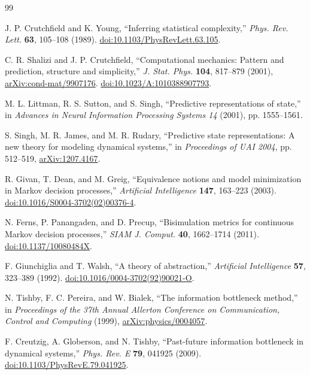 \documentclass[11pt]{article}
\begin{document}
\begin{thebibliography}{99}

J. P. Crutchfield and K. Young,
``Inferring statistical complexity,''
\emph{Phys. Rev. Lett.} \textbf{63}, 105--108 (1989).
\href{https://doi.org/10.1103/PhysRevLett.63.105}{doi:10.1103/PhysRevLett.63.105}.

C. R. Shalizi and J. P. Crutchfield,
``Computational mechanics: Pattern and prediction, structure and simplicity,''
\emph{J. Stat. Phys.} \textbf{104}, 817--879 (2001),
\href{https://arxiv.org/abs/cond-mat/9907176}{arXiv:cond-mat/9907176}.
\href{https://doi.org/10.1023/A:1010388907793}{doi:10.1023/A:1010388907793}.

M. L. Littman, R. S. Sutton, and S. Singh,
``Predictive representations of state,''
in \emph{Advances in Neural Information Processing Systems 14} (2001), pp. 1555--1561.

S. Singh, M. R. James, and M. R. Rudary,
``Predictive state representations: A new theory for modeling dynamical systems,''
in \emph{Proceedings of UAI 2004}, pp. 512--519,
\href{https://arxiv.org/abs/1207.4167}{arXiv:1207.4167}.

R. Givan, T. Dean, and M. Greig,
``Equivalence notions and model minimization in Markov decision processes,''
\emph{Artificial Intelligence} \textbf{147}, 163--223 (2003).
\href{https://doi.org/10.1016/S0004-3702(02)00376-4}{doi:10.1016/S0004-3702(02)00376-4}.

N. Ferns, P. Panangaden, and D. Precup,
``Bisimulation metrics for continuous Markov decision processes,''
\emph{SIAM J. Comput.} \textbf{40}, 1662--1714 (2011).
\href{https://doi.org/10.1137/10080484X}{doi:10.1137/10080484X}.

F. Giunchiglia and T. Walsh,
``A theory of abstraction,''
\emph{Artificial Intelligence} \textbf{57}, 323--389 (1992).
\href{https://doi.org/10.1016/0004-3702(92)90021-O}{doi:10.1016/0004-3702(92)90021-O}.

N. Tishby, F. C. Pereira, and W. Bialek,
``The information bottleneck method,''
in \emph{Proceedings of the 37th Annual Allerton Conference on Communication, Control and Computing} (1999),
\href{https://arxiv.org/abs/physics/0004057}{arXiv:physics/0004057}.

F. Creutzig, A. Globerson, and N. Tishby,
``Past-future information bottleneck in dynamical systems,''
\emph{Phys. Rev. E} \textbf{79}, 041925 (2009).
\href{https://doi.org/10.1103/PhysRevE.79.041925}{doi:10.1103/PhysRevE.79.041925}.


\end{thebibliography}
\end{document}
